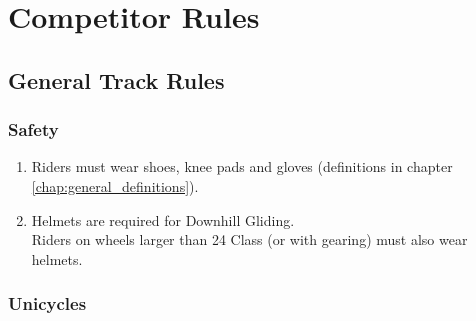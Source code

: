 \chapter{Competitor Rules}

\section{General Track Rules}

\subsection{Safety}

\begin{enumerate}[leftmargin=1.5em,labelsep=*]
  \item Riders must wear shoes, knee pads and gloves (definitions in chapter \ref{chap:general_definitions}).

  \item Helmets are required for Downhill Gliding. \\
  Riders on wheels larger than 24 Class (or with gearing) must also wear helmets.
\end{enumerate}

\subsection{Unicycles}

